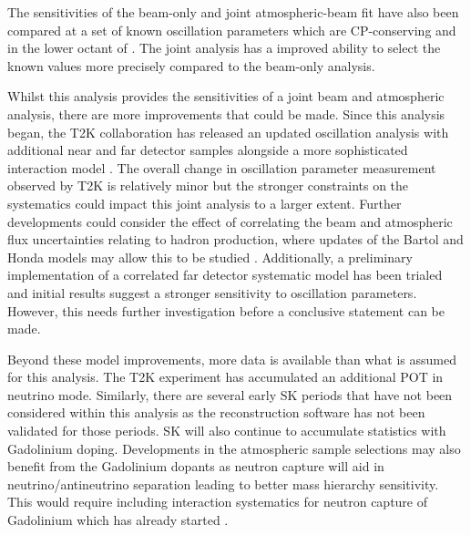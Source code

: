 The sensitivities of the beam-only and joint atmospheric-beam fit have also been compared at a set of known oscillation parameters which are CP-conserving and in the lower octant of . The joint analysis has a  improved ability to select the known values more precisely compared to the beam-only analysis.

Whilst this analysis provides the sensitivities of a joint beam and atmospheric analysis, there are more improvements that could be made. Since this analysis began, the T2K collaboration has released an updated oscillation analysis with additional near and far detector samples alongside a more sophisticated interaction model \cite{Bronner2022-wd}. The overall change in oscillation parameter measurement observed by T2K is relatively minor but the stronger constraints on the systematics could impact this joint analysis to a larger extent.
Further developments could consider the effect of correlating the beam and atmospheric flux uncertainties relating to hadron production, where updates of the Bartol and Honda models may allow this to be studied \cite{Sato2022-ss}. Additionally, a preliminary implementation of a correlated far detector systematic model has been trialed and initial results suggest a stronger sensitivity to oscillation parameters. However, this needs further investigation before a conclusive statement can be made.

Beyond these model improvements, more data is available than what is assumed for this analysis. The T2K experiment has accumulated an additional POT in neutrino mode. Similarly, there are several early SK periods that have not been considered within this analysis as the reconstruction software has not been validated for those periods. SK will also continue to accumulate statistics with Gadolinium doping. Developments in the atmospheric sample selections may also benefit from the Gadolinium dopants as neutron capture will aid in neutrino/antineutrino separation leading to better mass hierarchy sensitivity. This would require including interaction systematics for neutron capture of Gadolinium which has already started \cite{10.48550/arxiv.2209.08609}.

